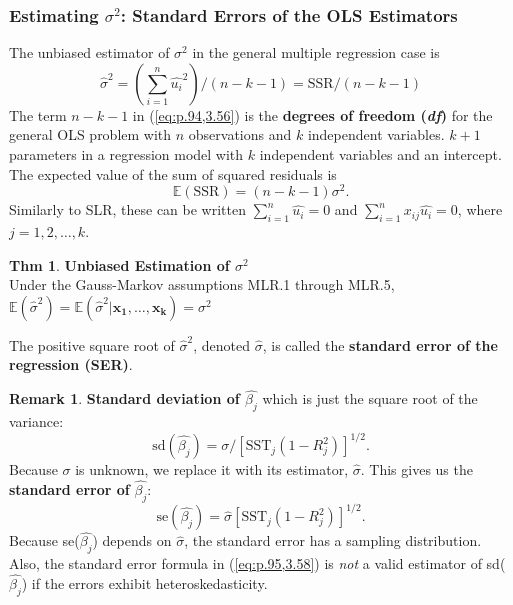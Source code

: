 \documentclass[a4paper, 10pt]{article}
\theoremstyle{definition}	%
\newtheorem{theorem}{Thm}
\newtheorem*{remark}{Remark}
\begin{document}
\subsubsection{Estimating \texorpdfstring{$\sigma^2$}{sigma squared}: Standard Errors of the OLS Estimators}
The unbiased estimator of $\sigma^2$ in the general multiple regression case is 
\begin{equation}
    \hat{\sigma}^2 = (\sum_{i=1}^n \hat{u_i}^2) / (n-k-1) = \text{SSR} / (n-k-1) \label{eq:p.94,3.56}
\end{equation}
The term $n-k-1$ in (\ref{eq:p.94,3.56}) is the \textbf{degrees of freedom (\textit{df})} for the general OLS problem with $n$ observations and $k$ independent variables. $k+1$ parameters in a regression model with $k$ independent variables and an intercept.\\
The expected value of the sum of squared residuals is 
\begin{equation*}
    \mathbb{E}(\text{SSR}) = (n-k-1)\sigma^2.
\end{equation*}
Similarly to SLR, these can be written $\sum_{i=1}^{n} \hat{u_i} = 0$ and $\sum_{i=1}^{n} x_{ij}\hat{u_i} = 0$, where $j = 1, 2, \ldots, k$.
\begin{theorem}
    \textbf{Unbiased Estimation of $\sigma^2$}\\
    Under the Gauss-Markov assumptions MLR.1 through MLR.5, $\mathbb{E}(\hat{\sigma}^2) =  \mathbb{E}(\hat{\sigma}^2|\mathbf{x_1, \ldots, \mathbf{x_k}})=\sigma^2$
\end{theorem}
The positive square root of $\hat{\sigma}^2$, denoted $\hat{\sigma}$, is called the \textbf{standard error of the regression (SER)}.
\begin{remark}
    \textbf{Standard deviation of $\hat{\beta_j}$} which is just the square root of the variance:
    \begin{equation*}
        \text{sd}(\hat{\beta_j}) = \sigma/ \left[ \text{SST}_j(1-R_j^2)\right]^{1/2}.
    \end{equation*}
    Because $\sigma$ is unknown, we replace it with its estimator, $\hat{\sigma}$. This gives us the \textbf{standard error of} $\hat{\beta_j}$:
    \begin{equation}
        \text{se}(\hat{\beta_j}) = \hat{\sigma} \left[ \text{SST}_j(1-R_j^2)\right]^{1/2}.
        \label{eq:p.95,3.58}
    \end{equation}
    Because se($\hat{\beta_j}$) depends on $\hat{\sigma}$, the standard error has a sampling distribution. Also, the standard error formula in (\ref{eq:p.95,3.58}) is \textit{not} a valid estimator of sd($\hat{\beta_j}$) if the errors exhibit heteroskedasticity. 
\end{remark}
\end{document}
